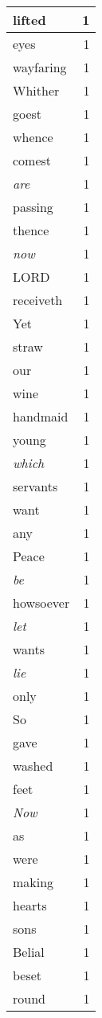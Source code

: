 \begin{center}
\begin{longtable}{l|r}
lifted & 1 \\ \hline
eyes & 1 \\ \hline
wayfaring & 1 \\ \hline
Whither & 1 \\ \hline
goest & 1 \\ \hline
whence & 1 \\ \hline
comest & 1 \\ \hline
\emph{are} & 1 \\ \hline
passing & 1 \\ \hline
thence & 1 \\ \hline
\emph{now} & 1 \\ \hline
LORD & 1 \\ \hline
receiveth & 1 \\ \hline
Yet & 1 \\ \hline
straw & 1 \\ \hline
our & 1 \\ \hline
wine & 1 \\ \hline
handmaid & 1 \\ \hline
young & 1 \\ \hline
\emph{which} & 1 \\ \hline
servants & 1 \\ \hline
want & 1 \\ \hline
any & 1 \\ \hline
Peace & 1 \\ \hline
\emph{be} & 1 \\ \hline
howsoever & 1 \\ \hline
\emph{let} & 1 \\ \hline
wants & 1 \\ \hline
\emph{lie} & 1 \\ \hline
only & 1 \\ \hline
So & 1 \\ \hline
gave & 1 \\ \hline
washed & 1 \\ \hline
feet & 1 \\ \hline
\emph{Now} & 1 \\ \hline
as & 1 \\ \hline
were & 1 \\ \hline
making & 1 \\ \hline
hearts & 1 \\ \hline
sons & 1 \\ \hline
Belial & 1 \\ \hline
beset & 1 \\ \hline
round & 1 \\ \hline

\end{longtable}
\end{center}
